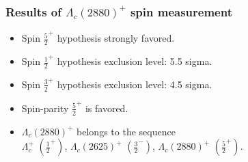 \documentclass[10pt]{beamer}
\def\Lc{{\Lambda_c^+}}
\def\LcII{{\Lambda_c(2625)^+}}
\def\LcIII{{\Lambda_c(2880)^+}}
\begin{document}
\begin{frame}[label=belle-results]%
  \frametitle{Results of $\LcIII$ spin measurement}
  \large
  \begin{itemize}
    \item Spin $\frac{5}{2}^+$ hypothesis strongly favored.
    \item Spin $\frac{1}{2}^+$ hypothesis exclusion level: 5.5 sigma.
    \item Spin $\frac{3}{2}^+$ hypothesis exclusion level: 4.5 sigma.
    \item Spin-parity $\frac{5}{2}^+$ is favored.
    \item $\LcIII$ belongs to the sequence \\[1ex]
      \hfill
      $\Lc$     $\left(\frac{1}{2}^+\right)$,
      $\LcII$   $\left(\frac{3}{2}^-\right)$,
      $\LcIII$  $\left(\frac{5}{2}^+\right)$.
      \hfill\null
  \end{itemize}
\end{frame}%
\end{document}
